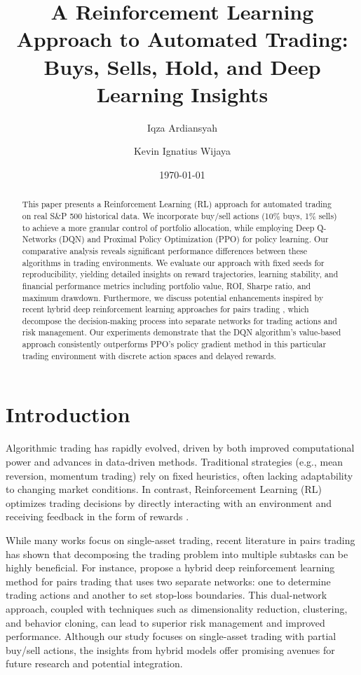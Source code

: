 \documentclass[11pt]{article}
\title{A Reinforcement Learning Approach to Automated Trading: Buys, Sells, Hold, and Deep Learning Insights}
\author[1]{Iqza Ardiansyah}
\author[2]{Kevin Ignatius Wijaya}
\affil[1]{Student ID: 2206810042\\ Faculty of Computer Science, Universitas Indonesia}
\affil[2]{Student ID: 2206083470\\ Faculty of Computer Science, Universitas Indonesia}
\date{\today}
\begin{document}
\maketitle

\begin{abstract}
This paper presents a Reinforcement Learning (RL) approach for automated trading on real S\&P 500 historical data. We incorporate buy/sell actions (10\% buys, 1\% sells) to achieve a more granular control of portfolio allocation, while employing Deep Q-Networks (DQN) and Proximal Policy Optimization (PPO) for policy learning. Our comparative analysis reveals significant performance differences between these algorithms in trading environments. We evaluate our approach with fixed seeds for reproducibility, yielding detailed insights on reward trajectories, learning stability, and financial performance metrics including portfolio value, ROI, Sharpe ratio, and maximum drawdown. Furthermore, we discuss potential enhancements inspired by recent hybrid deep reinforcement learning approaches for pairs trading \citep{kim2022hybrid}, which decompose the decision-making process into separate networks for trading actions and risk management. Our experiments demonstrate that the DQN algorithm's value-based approach consistently outperforms PPO's policy gradient method in this particular trading environment with discrete action spaces and delayed rewards.
\end{abstract}

\section{Introduction}
Algorithmic trading has rapidly evolved, driven by both improved computational power and advances in data-driven methods. Traditional strategies (e.g., mean reversion, momentum trading) rely on fixed heuristics, often lacking adaptability to changing market conditions. In contrast, Reinforcement Learning (RL) optimizes trading decisions by directly interacting with an environment and receiving feedback in the form of rewards \citep{sutton_2018_irl}.

While many works focus on single-asset trading, recent literature in pairs trading has shown that decomposing the trading problem into multiple subtasks can be highly beneficial. For instance, \citep{kim2022hybrid} propose a hybrid deep reinforcement learning method for pairs trading that uses two separate networks: one to determine trading actions and another to set stop-loss boundaries. This dual-network approach, coupled with techniques such as dimensionality reduction, clustering, and behavior cloning, can lead to superior risk management and improved performance. Although our study focuses on single-asset trading with partial buy/sell actions, the insights from hybrid models offer promising avenues for future research and potential integration.
\end{document}
